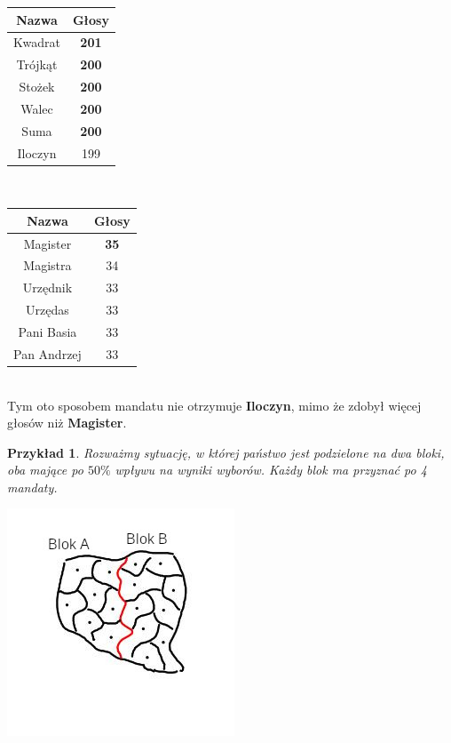 \documentclass[12pt,a4paper]{article}
\theoremstyle{break}
\newtheorem{example}{Przykład}[section]
\begin{document}
\begin{tabular}{|c|c|}\hline
	Nazwa   & Głosy\\\hline
	Kwadrat & \textbf{201}\\\hline
	Trójkąt & \textbf{200}\\\hline
	Stożek  & \textbf{200}\\\hline
	Walec   & \textbf{200}\\\hline
	Suma    & \textbf{200}\\\hline
	Iloczyn & 199\\\hline
\end{tabular} $\qquad\qquad\qquad\qquad\qquad$
\begin{tabular}{|c|c|}\hline
	Nazwa        & Głosy\\\hline
	Magister     & \textbf{35}\\\hline
	Magistra     & 34\\\hline
	Urzędnik     & 33\\\hline
	Urzędas      & 33\\\hline
	Pani Basia   & 33\\\hline
	Pan Andrzej  & 33\\\hline
\end{tabular}\\

Tym oto sposobem mandatu nie otrzymuje \textbf{Iloczyn}, mimo że zdobył więcej głosów niż \textbf{Magister}.

\begin{example}
	Rozważmy sytuację, w której państwo jest podzielone na dwa bloki, oba mające po $50\%$ wpływu na wyniki wyborów. Każdy blok ma przyznać po 4 mandaty.
\end{example}

\begin{center}
	\includegraphics{5050.jpg}
\end{center}
\end{document}
